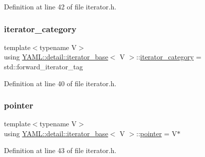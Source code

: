 Definition at line 42 of file iterator.\+h.

\mbox{\label{class_y_a_m_l_1_1detail_1_1iterator__base_ac98b382d4a92feab7cbcc3bb0bbef9a3}} 
\subsubsection{\texorpdfstring{iterator\_category}{iterator\_category}}
{\footnotesize\ttfamily template$<$typename V$>$ \\
using \mbox{\hyperlink{class_y_a_m_l_1_1detail_1_1iterator__base}{Y\+A\+M\+L\+::detail\+::iterator\+\_\+base}}$<$ V $>$\+::\mbox{\hyperlink{class_y_a_m_l_1_1detail_1_1iterator__base_ac98b382d4a92feab7cbcc3bb0bbef9a3}{iterator\+\_\+category}} =  std\+::forward\+\_\+iterator\+\_\+tag}



Definition at line 40 of file iterator.\+h.

\mbox{\label{class_y_a_m_l_1_1detail_1_1iterator__base_a1d2a6d42b258a593e8ae888de6c63435}} 
\subsubsection{\texorpdfstring{pointer}{pointer}}
{\footnotesize\ttfamily template$<$typename V$>$ \\
using \mbox{\hyperlink{class_y_a_m_l_1_1detail_1_1iterator__base}{Y\+A\+M\+L\+::detail\+::iterator\+\_\+base}}$<$ V $>$\+::\mbox{\hyperlink{class_y_a_m_l_1_1detail_1_1iterator__base_a1d2a6d42b258a593e8ae888de6c63435}{pointer}} =  V$\ast$}



Definition at line 43 of file iterator.\+h.

\mbox{\label{class_y_a_m_l_1_1detail_1_1iterator__base_aed8b6adc6449894e1e66bb81a75a4ca0}} 
